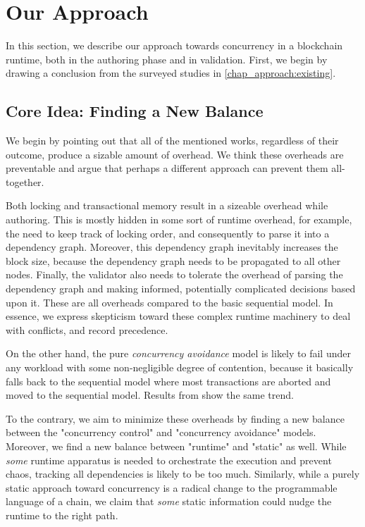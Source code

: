 \section{Our Approach} \label{chap_desgin:sec:our_approach}

In this section, we describe our approach towards concurrency in a blockchain runtime, both in the
authoring phase and in validation. First, we begin by drawing a conclusion from the surveyed studies
in \ref{chap_approach:existing}.

\subsection{Core Idea: Finding a New Balance}

We begin by pointing out that all of the mentioned works, regardless of their outcome, produce a
sizable amount of overhead. We think these overheads are preventable and argue that perhaps a different
approach can prevent them all-together.

Both locking and transactional memory result in a sizeable overhead while authoring. This is mostly
hidden in some sort of runtime overhead, for example, the need to keep track of locking order, and
consequently to parse it into a dependency graph. Moreover, this dependency graph inevitably
increases the block size, because the dependency graph needs to be propagated to all other nodes.
Finally, the validator also needs to tolerate the overhead of parsing the dependency graph and
making informed, potentially complicated decisions based upon it. These are all overheads compared
to the basic sequential model. In essence, we express skepticism toward these complex runtime
machinery to deal with conflicts, and record precedence.

On the other hand, the pure \textit{concurrency avoidance} model is likely to fail under any
workload with some non-negligible degree of contention, because it basically falls back to the
sequential model where most transactions are aborted and moved to the sequential model. Results from
\cite{saraphEmpiricalStudySpeculative2019} show the same trend.

To the contrary, we aim to minimize these overheads by finding a new balance between the
"concurrency control" and "concurrency avoidance" models. Moreover, we find a new balance
between "runtime" and "static" as well. While \textit{some} runtime apparatus is needed to orchestrate the
execution and prevent chaos, tracking all dependencies is likely to be too much. Similarly, while a
purely static approach toward concurrency is a radical change to the programmable language of a chain, we
claim that \textit{some} static information could nudge the runtime to the right path.

